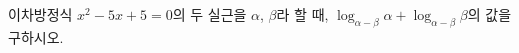 이차방정식 $x^2-5x+5=0$의 두 실근을 $\alpha$, $\beta$라 할 때, $\log_{\alpha-\beta} \alpha+\log_{\alpha-\beta} \beta$의 값을 구하시오. \cond{$\alpha>\beta$}
